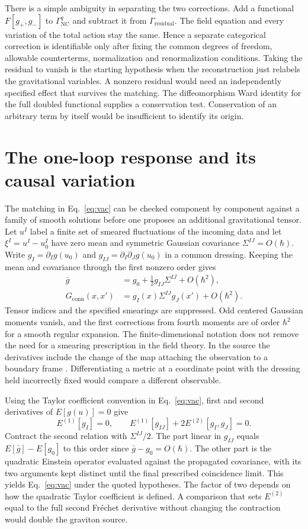 \documentclass[11pt,letterpaper]{article}
\begin{document}
There is a simple ambiguity in separating the two corrections. Add a functional $F[g_+,g_-]$ to $\Gamma^q_{\mathrm{NC}}$ and subtract it from $\Gamma_{\mathrm{residual}}$. The field equation and every variation of the total action stay the same. Hence a separate categorical correction is identifiable only after fixing the common degrees of freedom, allowable counterterms, normalization and renormalization conditions. Taking the residual to vanish is the starting hypothesis when the reconstruction just relabels the gravitational variables. A nonzero residual would need an independently specified effect that survives the matching. The diffeomorphism Ward identity for the full doubled functional supplies a conservation test. Conservation of an arbitrary term by itself would be insufficient to identify its origin.

\section{The one-loop response and its causal variation}
\label{sec:response}
The matching in Eq.~\eqref{eq:vac} can be checked component by component
against a family of smooth solutions before one proposes an additional
gravitational tensor. Let \(u^I\) label a finite set of smeared
fluctuations of the incoming data and let \(\xi^I=u^I-u^I_0\) have
zero mean and symmetric Gaussian covariance \(\Sigma^{IJ}=O(\hbar)\).
Write \(g_I=\partial_I g(u_0)\) and \(g_{IJ}=\partial_I\partial_Jg(u_0)\)
in a common dressing. Keeping the mean and covariance through the first
nonzero order gives
\begin{align}
 \bar g&=g_0+\tfrac12 g_{IJ}\Sigma^{IJ}+O(\hbar^2),\\
 G_{\mathrm{conn}}(x,x')&=
       g_I(x)\Sigma^{IJ}g_J(x')+O(\hbar^2).
 \label{eq:transport-cov}
\end{align}
Tensor indices and the specified smearings are suppressed.
Odd centered Gaussian moments vanish, and the first corrections from
fourth moments are of order \(\hbar^2\) for a smooth regular expansion.
The finite-dimensional notation does not remove the need for a smearing
prescription in the field theory. In the source the derivatives include
the change of the map attaching the observation to a boundary frame
\cite[Eq.~(6.8)]{nc}. Differentiating a metric at a coordinate point
with the dressing held incorrectly fixed would compare a different
observable.

Using the Taylor coefficient convention in Eq.~\eqref{eq:vac}, first
and second derivatives of \(E[g(u)]=0\) give
\[
 E^{(1)}[g_I]=0,\qquad
 E^{(1)}[g_{IJ}]+2 E^{(2)}[g_I,g_J]=0 .
\]
Contract the second relation with \(\Sigma^{IJ}/2\). The part linear
in \(g_{IJ}\) equals \(E[\bar g]-E[g_0]\) to this order since
\(\bar g-g_0=O(\hbar)\). The other part is the quadratic Einstein
operator evaluated against the propagated covariance, with its two
arguments kept distinct until the final prescribed coincidence limit.
This yields Eq.~\eqref{eq:vac} under the quoted hypotheses. The
factor of two depends on how the quadratic Taylor coefficient is
defined. A comparison that sets \(E^{(2)}\) equal to the full second
Fréchet derivative without changing the contraction would double the
graviton source.
\end{document}
